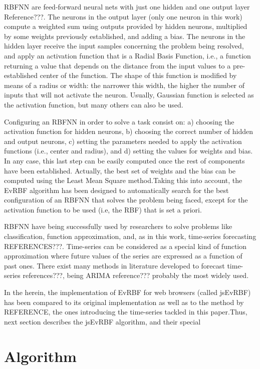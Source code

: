 \documentclass{llncs}
\begin{document}
RBFNN are feed-forward neural nets with just one hidden and one output layer Reference???. The neurons in the output layer (only one neuron in this work) compute a weighted sum using outputs provided by hidden neurons, multiplied by some weights previously established, and adding a bias. The neurons in the hidden layer receive the input samples concerning the problem being resolved, and apply an activation function that  is a Radial Basis Function, i.e., a function returning a value that depends on the distance from the input values to a pre-established center of the function. The shape of this function is modified by means of a radius or width: the narrower this width, the higher the number of inputs that will not activate the neuron. Usually, Gaussian function is selected as the activation function, but many others can also be used.

Configuring an RBFNN in order to solve a task consist on: a) choosing the activation function for hidden neurons, b) choosing the correct number of hidden and output neurons,  c) setting the parameters needed to apply the activation functions (i.e., center and radius), and d) setting the values for weights and bias. In any case, this last step can be easily computed once the rest of components have been established. Actually, the best set of weights and the bias can be computed using the Least Mean Square method.Taking this into account, the EvRBF algorithm has been designed to automatically search for the best configuration of an RBFNN that solves the problem being faced, except for the activation function to be used (i.e, the RBF) that is set a priori.

RBFNN have being successfully used by researchers to solve problems like classification, function approximation, and, as in this work, time-series forecasting REFERENCES???. Time-series can be considered as a special kind of function approximation where future values of the series are expressed as a function of past ones. There exist many methods in literature developed to forecast time-series references???, being ARIMA reference??? probably the most widely used. 

In the herein, the implementation of EvRBF for web browsers (called jsEvRBF) has been compared to its original implementation as well as  to the method by REFERENCE, the ones introducing the time-series tackled in this paper.Thus, next section describes the jsEvRBF algorithm, and their special


\section{Algorithm}
\label{sec:algorithm}
\end{document}
